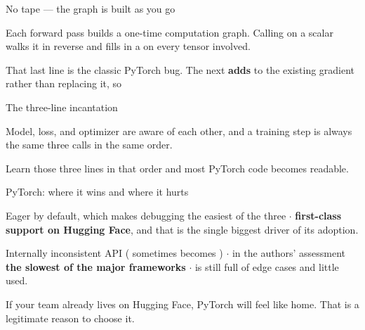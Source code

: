 \documentclass[aspectratio=169,11pt,t]{beamer}
\begin{document}
\begin{frame}[shrink=25]{No tape --- the graph is built as you go}
{\fontsize{9.4}{12.6}\selectfont\color{fg2}Each forward pass builds a one-time computation graph. Calling  on a scalar walks it in reverse and fills in a  on every tensor involved.\par}\vskip 4pt
\begin{iband}[rose]
That last line is the classic PyTorch bug. The next  \textbf{adds} to the existing gradient rather than replacing it, so 
\end{iband}
\end{frame}

\begin{frame}[shrink=25]{The three-line incantation}
{\fontsize{9.4}{12.6}\selectfont\color{fg2}Model, loss, and optimizer are aware of each other, and a training step is always the same three calls in the same order.\par}\vskip 4pt
{\fontsize{9.4}{12.6}\selectfont\color{fg2}Learn those three lines in that order and most PyTorch code becomes readable.\par}\vskip 4pt
\end{frame}

\begin{frame}[shrink=25]{PyTorch: where it wins and where it hurts}
\begin{minipage}[t]{0.494\textwidth}
\begin{icardgood}
Eager by default, which makes debugging the easiest of the three $\cdot$ \textbf{first-class support on Hugging Face}, and that is the single biggest driver of its adoption.
\end{icardgood}
\end{minipage}%
\hfill
\begin{minipage}[t]{0.494\textwidth}
\begin{icardbad}
Internally inconsistent API ( sometimes becomes ) $\cdot$ in the authors' assessment \textbf{the slowest of the major frameworks} $\cdot$  is still full of edge cases and little used.
\end{icardbad}
\end{minipage}%
{\fontsize{9.4}{12.6}\selectfont\color{fg2}If your team already lives on Hugging Face, PyTorch will feel like home. That is a legitimate reason to choose it.\par}\vskip 4pt
\end{frame}
\end{document}
